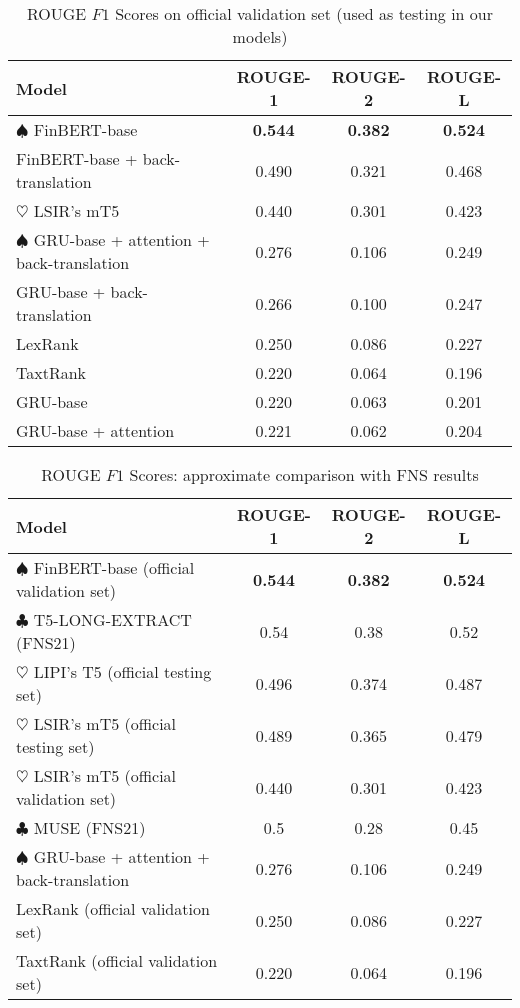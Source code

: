 \begin{table}[ht]
    \centering
    \begin{tabular}{lccc}
        \toprule
        \textbf{Model} & \textbf{ROUGE-1} & \textbf{ROUGE-2} & \textbf{ROUGE-L} \\
        \midrule
            $\spadesuit$ FinBERT-base & \textbf{0.544} & \textbf{0.382} & \textbf{0.524} \\
            FinBERT-base + back-translation & 0.490 & 0.321 & 0.468 \\
            $\heartsuit$ LSIR's mT5 & 0.440 & 0.301 & 0.423 \\
            $\spadesuit$ GRU-base + attention + back-translation & 0.276 & 0.106 & 0.249 \\
            GRU-base + back-translation & 0.266 & 0.100 & 0.247 \\
            LexRank & 0.250 & 0.086 & 0.227 \\
            TaxtRank & 0.220 & 0.064 & 0.196 \\
            GRU-base & 0.220 & 0.063 & 0.201 \\
            GRU-base + attention & 0.221 & 0.062 & 0.204 \\
        \bottomrule
    \end{tabular}\caption{ROUGE $F1$ Scores on official validation set (used as testing in our models)}
    \label{tab:rouge_performance_validation}
\end{table}

\begin{table}[ht]
    \centering
    \begin{tabular}{lccc}
        \toprule
        \textbf{Model} & \textbf{ROUGE-1} & \textbf{ROUGE-2} & \textbf{ROUGE-L} \\
        \midrule
            $\spadesuit$ FinBERT-base (official validation set) & \textbf{0.544} & \textbf{0.382} & \textbf{0.524} \\
            $\clubsuit$ T5-LONG-EXTRACT (FNS21) & 0.54 & 0.38 & 0.52 \\
            $\heartsuit$ LIPI's T5 (official testing set) & 0.496 & 0.374 & 0.487 \\
            $\heartsuit$ LSIR's mT5 (official testing set) & 0.489 & 0.365 & 0.479 \\
            $\heartsuit$ LSIR's mT5 (official validation set) & 0.440 & 0.301 & 0.423 \\
            $\clubsuit$ MUSE (FNS21) & 0.5 & 0.28 & 0.45 \\
            $\spadesuit$ GRU-base + attention + back-translation & 0.276 & 0.106 & 0.249 \\
            LexRank (official validation set) & 0.250 & 0.086 & 0.227 \\
            TaxtRank (official validation set) & 0.220 & 0.064 & 0.196 \\
        \bottomrule
    \end{tabular}\caption{ROUGE $F1$ Scores: approximate comparison with FNS results}
    \label{tab:rouge_performance}
\end{table}

